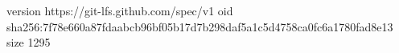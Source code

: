 version https://git-lfs.github.com/spec/v1
oid sha256:7f78e660a87fdaabcb96bf05b17d7b298daf5a1c5d4758ca0fc6a1780fad8e13
size 1295

